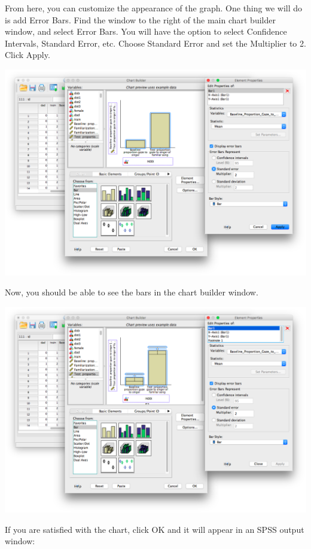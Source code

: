 \documentclass[
]{book}
\begin{document}
From here, you can customize the appearance of the graph. One thing we will do is add Error Bars. Find the window to the right of the main chart builder window, and select {Error Bars}. You will have the option to select Confidence Intervals, Standard Error, etc. Choose {Standard Error} and set the {Multiplier to 2}. Click {Apply}.

\includegraphics{img/6.4.28.png}

Now, you should be able to see the bars in the chart builder window.

\includegraphics{img/6.4.29.png}

If you are satisfied with the chart, click OK and it will appear in an SPSS output window:
\end{document}
